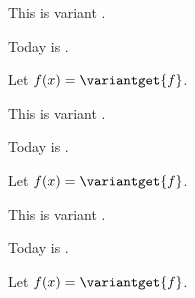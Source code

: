 \documentclass{minimal}
\begin{document}

This is variant \thevariant.

Today is .

Let $f(x)=\variantget{f}$.


This is variant \thevariant.

Today is .

Let $f(x)=\variantget{f}$.


This is variant \thevariant.

Today is .

Let $f(x)=\variantget{f}$.
\end{document}
